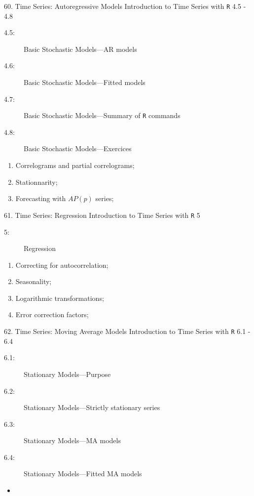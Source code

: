 \begin{CHPT_SUMM_AUTO}[label = {L.-60}]{60. Time Series: Autoregressive Models}
Introduction to Time Series with \texttt{R} 4.5 - 4.8
\begin{description}
	\item[4.5:]	Basic Stochastic Models---AR models
	\item[4.6:]	Basic Stochastic Models---Fitted models
	\item[4.7:]	Basic Stochastic Models---Summary of \texttt{R} commands
	\item[4.8:]	Basic Stochastic Models---Exercices
\end{description}
\tcbline
	\begin{enumerate}
		\item[]	Correlograms and partial correlograms;
		\item[]	Stationnarity;
		\item[]	Forecasting with $AP(p)$ series;
	\end{enumerate}
\end{CHPT_SUMM_AUTO}

\begin{CHPT_SUMM_AUTO}[label = {L.-61}]{61. Time Series: Regression}
Introduction to Time Series with \texttt{R} 5
\begin{description}
	\item[5:]	Regression
\end{description}
\tcbline
	\begin{enumerate}
		\item	Correcting for autocorrelation;
		\item	Seasonality;
		\item	Logarithmic transformations;
		\item	Error correction factors;
	\end{enumerate}
\end{CHPT_SUMM_AUTO}

\begin{CHPT_SUMM_AUTO}[label = {L.-62}]{62. Time Series: Moving Average Models}
Introduction to Time Series with \texttt{R} 6.1 - 6.4
\begin{description}
	\item[6.1:]	Stationary Models---Purpose
	\item[6.2:]	Stationary Models---Strictly stationary series
	\item[6.3:]	Stationary Models---MA models
	\item[6.4:]	Stationary Models---Fitted MA models
\end{description}
\tcbline
	\begin{itemize}
		\item	
	\end{itemize}
\end{CHPT_SUMM_AUTO}


